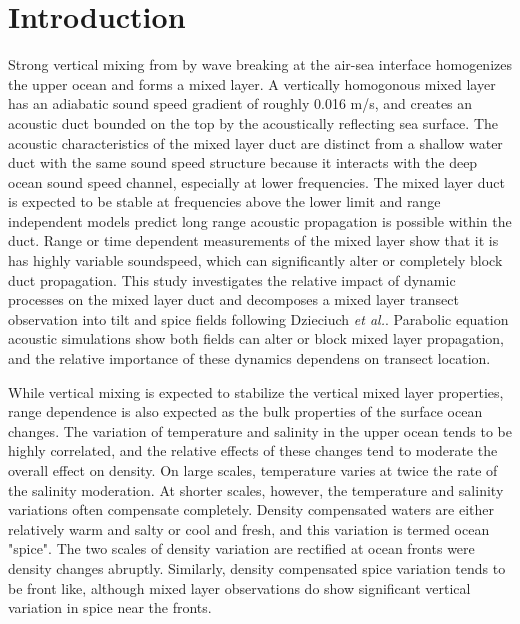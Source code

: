 \documentclass[preprint,NumberedRefs]{JASA}
\begin{document}
\section{\label{sec:intro} Introduction}
Strong vertical mixing from by wave breaking at the air-sea interface homogenizes the upper ocean and forms a mixed layer. A vertically homogonous mixed layer has an adiabatic sound speed gradient of roughly 0.016 m/s, and creates an acoustic duct bounded on the top by the acoustically reflecting sea surface. The acoustic characteristics of the mixed layer duct are distinct from a shallow water duct with the same sound speed structure because it interacts with the deep ocean sound speed channel\citep{porter93}, especially at lower frequencies. The mixed layer duct is expected to be stable at frequencies above the lower limit\citep{Urick1982Prop} and range independent models predict long range acoustic propagation is possible within the duct. Range or time dependent measurements of the mixed layer show that it is has highly variable soundspeed\citep{cole2010seasonal,rudnick1999compensation,klymak2015}, which can significantly alter or completely block duct propagation\citep{colosi2020observations,colosi21}. This study investigates the relative impact of dynamic processes on the mixed layer duct and decomposes a mixed layer transect observation into tilt and spice fields following Dzieciuch \emph{et al.}\citep{dzieciuch2004}. Parabolic equation acoustic simulations\citep{collins93} show both fields can alter or block mixed layer propagation, and the relative importance of these dynamics dependens on transect location.

While vertical mixing is expected to stabilize the vertical mixed layer properties, range dependence is also expected as the bulk properties of the surface ocean changes\citep{ferrari2000}. The variation of temperature and salinity in the upper ocean tends to be highly correlated, and the relative effects of these changes tend to moderate the overall effect on density. On large scales, temperature varies at twice the rate of the salinity moderation. At shorter scales, however, the temperature and salinity variations often compensate completely. Density compensated waters are either relatively warm and salty or cool and fresh, and this variation is termed ocean "spice"\citep{munk1981evolution}. The two scales of density variation are rectified at ocean fronts were density changes abruptly. Similarly, density compensated spice variation tends to be front like, although mixed layer observations do show significant vertical variation in spice near the fronts.
\end{document}
